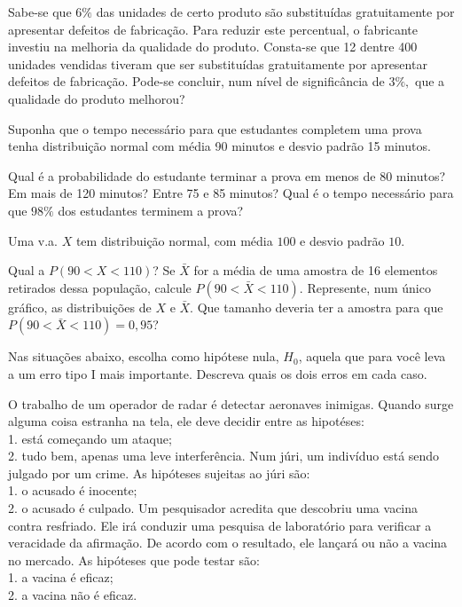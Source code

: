 \documentclass{report}
\begin{document}
\begin{Exercise}
\Question Sabe-se que $6\%$ das unidades de certo produto são substituídas gratuitamente por apresentar defeitos de fabricação. Para reduzir este percentual, o 
fabricante investiu na melhoria da qualidade do produto. Consta-se que 12 dentre 400 unidades vendidas tiveram que ser substituídas gratuitamente por apresentar defeitos 
de fabricação. Pode-se concluir, num nível de significância de $3\%,$ que a qualidade do produto melhorou?

\Question Suponha que o tempo necessário para que estudantes completem uma prova tenha distribuição normal com média 90 minutos e desvio padrão 15 minutos.
\begin{tasks}
\task Qual é a probabilidade do estudante terminar a prova em menos de 80 minutos?
\task Em mais de 120 minutos? 
\task Entre 75 e 85 minutos?
\task Qual é o tempo necessário para que $98\%$ dos estudantes terminem a prova?
\end{tasks}

\newpage

\Question Uma v.a. $X$ tem distribuição normal, com média $100$ e desvio padrão $10.$
\begin{tasks}
\task Qual a $P(90 < X < 110)$?
\task Se $\bar{X}$ for a média de uma amostra de 16 elementos retirados dessa população, calcule $P(90 < \bar{X} < 110)$.
\task Represente, num único gráfico, as distribuições de $X$ e $\bar{X}$.
\task Que tamanho deveria ter a amostra para que $P(90 < \bar{X}< 110) = 0,95$?
\end{tasks}

\Question Nas situações abaixo, escolha como hipótese nula, $H_0$, aquela que para você leva a um erro tipo I mais importante. Descreva quais os dois erros em 
cada caso.
\begin{tasks}
\task O trabalho de um operador de radar é detectar aeronaves inimigas. Quando surge alguma coisa estranha na tela, ele deve decidir entre as hipotéses:\\
1. está começando um ataque;\\
2. tudo bem, apenas uma leve interferência.
\task Num júri, um indivíduo está sendo julgado por um crime. As hipóteses sujeitas ao júri são:\\
1. o acusado é inocente;\\
2. o acusado é culpado.
\task Um pesquisador acredita que descobriu uma vacina contra resfriado. Ele irá conduzir uma pesquisa de laboratório para verificar a veracidade da afirmação. De acordo 
com o resultado, ele lançará ou não a vacina no mercado. As hipóteses que pode testar são:\\
1. a vacina é eficaz;\\
2. a vacina não é eficaz.
\end{tasks}


\end{Exercise}
\end{document}
